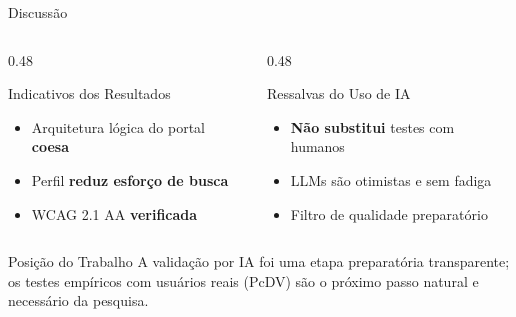 \documentclass[aspectratio=169]{beamer}
\begin{document}
\begin{frame}{Discussão}
    \begin{columns}[T]
        \begin{column}{0.48\textwidth}
            \begin{block}{Indicativos dos Resultados}
                \begin{itemize}\small
                    \item Arquitetura lógica do portal \textbf{coesa}
                    \item Perfil \textbf{reduz esforço de busca}
                    \item WCAG 2.1 AA \textbf{verificada}
                \end{itemize}
            \end{block}
        \end{column}
        \begin{column}{0.48\textwidth}
            \begin{alertblock}{Ressalvas do Uso de IA}
                \begin{itemize}\small
                    \item \textbf{Não substitui} testes com humanos
                    \item LLMs são otimistas e sem fadiga
                    \item Filtro de qualidade preparatório
                \end{itemize}
            \end{alertblock}
        \end{column}
    \end{columns}

    \vspace{0.15cm}

    \begin{exampleblock}{Posição do Trabalho}
        A validação por IA foi uma etapa preparatória transparente; os testes empíricos com usuários reais (PcDV) são o próximo passo natural e necessário da pesquisa.
    \end{exampleblock}

\end{frame}
\end{document}
